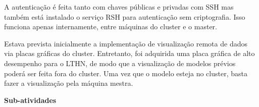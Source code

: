 A autenticação é feita tanto com chaves públicas e privadas com SSH mas também 
está instalado o serviço RSH para autenticação sem criptografia. Isso funciona 
apenas internamente, entre máquinas do cluster e o master. 

Estava prevista inicialmente a implementação de visualização remota de dados 
via placas gráficas do cluster. Entretanto, foi adquirida uma placa gráfica 
de alto desempenho para o LTHN, de modo que a visualização de modelos prévios 
poderá ser feita fora do cluster. Uma vez que o modelo esteja no cluster, 
basta fazer a visualização pela máquina mestra.

\textbf{Sub-atividades}

